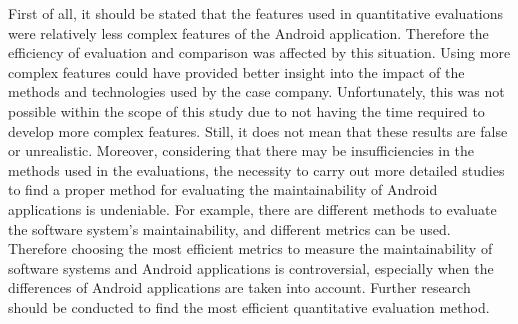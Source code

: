 First of all, it should be stated that the features used in quantitative evaluations were relatively less complex features of the Android application. Therefore the efficiency of evaluation and comparison was affected by this situation. Using more complex features could have provided better insight into the impact of the methods and technologies used by the case company. Unfortunately, this was not possible within the scope of this study due to not having the time required to develop more complex features. Still, it does not mean that these results are false or unrealistic. Moreover, considering that there may be insufficiencies in the methods used in the evaluations, the necessity to carry out more detailed studies to find a proper method for evaluating the maintainability of Android applications is undeniable. For example, there are different methods to evaluate the software system's maintainability, and different metrics can be used. Therefore choosing the most efficient metrics to measure the maintainability of software systems and Android applications is controversial, especially when the differences of Android applications are taken into account. Further research should be conducted to find the most efficient quantitative evaluation method.